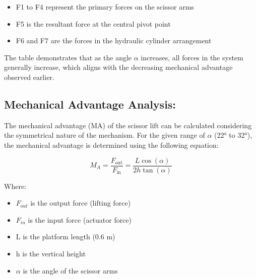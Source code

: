 \documentclass[../../main]{subfiles}
\begin{document}
\begin{itemize}
\item
  F1 to F4 represent the primary forces on the scissor arms
\item
  F5 is the resultant force at the central pivot point
\item
  F6 and F7 are the forces in the hydraulic cylinder arrangement
\end{itemize}
The table demonstrates that as the angle $\alpha$ increases, all forces in the
system generally increase, which aligns with the decreasing mechanical
advantage observed earlier.

\newpage
\subsection{Mechanical Advantage Analysis:}

The mechanical advantage (MA) of the scissor lift can be calculated
considering the symmetrical nature of the mechanism. For the given range
of $\alpha$ (22° to 32°), the mechanical advantage is determined using the
following equation:

\begin{equation}
  M_A = \frac{F_{\text{out}}}{F_{\text{in}}} = \frac{L \cos(\alpha)}{2h \tan(\alpha)}
\end{equation}

Where:

\begin{itemize}
\item
  \(F_{out}\) is the output force (lifting force)
\item
  \(F_{in}\) is the input force (actuator force)
\item
  L is the platform length (0.6 m)
\item
  h is the vertical height
\item
  $\alpha$ is the angle of the scissor arms
\end{itemize}
\end{document}
